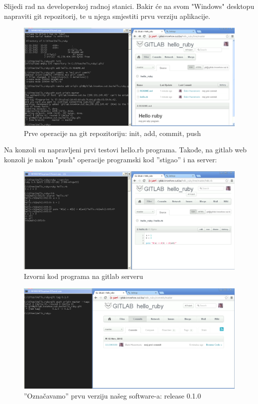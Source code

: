 \documentclass[times, utf8, seminar]{fit}
\begin{document}
Slijedi rad na developerskoj radnoj stanici. Bakir će na svom "Windows" desktopu napraviti git repozitorij, te u njega smjestiti prvu verziju aplikacije.

\begin{figure}[H]
\centering
\includegraphics[width=15cm]{img/gitlab_first_commit.png}
\caption{Prve operacije na git repozitoriju: init, add, commit, push}
\end{figure}

Na konzoli su napravljeni prvi testovi hello.rb programa. Takođe, na gitlab web konzoli je nakon "push" operacije programski kod ''stigao'' i na server:

\begin{figure}[H]
\centering
\includegraphics[width=15cm]{img/gitlab_first_commit_2.png}
\caption{Izvorni kod programa na gitlab serveru}
\end{figure}

\begin{figure}[H]
\centering
\includegraphics[width=15cm]{img/gitlab_tag_first_release.png}
\caption{''Označavamo'' prvu verziju našeg software-a: release 0.1.0}
\end{figure}
\end{document}
